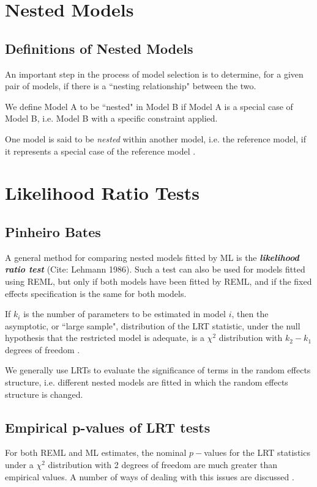 \newpage
\section{Nested Models }

\subsection{Definitions of Nested Models}
An important step in the process of model selection is to determine, for a given pair of models, if there is a ``nesting relationship" between the two.

We define Model A to be ``nested" in Model B if Model A is a special case of Model B, i.e. Model B with a specific constraint applied.

One model is said to be \emph{nested} within another model, i.e. the reference model, if it represents a special case of the reference model \citep{pb}.

\newpage
\section{Likelihood Ratio Tests}
\subsection{Pinheiro Bates}
A general method for comparing nested models fitted by ML is the \textbf{\emph{likelihood ratio test}} (Cite: Lehmann 1986). Such a test can also be used for models fitted using REML, but only if both models have been fitted by REML, and if the fixed effects specification is the same for both models.

If $k_i$ is the number of parameters to be estimated in model $i$, then the asymptotic, or ``large sample", distribution of the LRT statistic, under the null hypothesis that the restricted model is adequate, is a $\chi^2$ distribution with $k_2-k_1$ degrees of freedom \citep[pg.83]{pb}.

We generally use LRTs to evaluate the significance of terms in the random effects structure, i.e. different nested models are fitted in which the random effects structure is changed.

\subsection{Empirical p-values of LRT tests}
For both REML and ML estimates, the nominal $p-$values for the LRT statistics under a $\chi^2$ distribution with 2 degrees of freedom are much greater than empirical values. A number of ways of dealing with this issues are discussed \citep[pg.86]{pb}.

